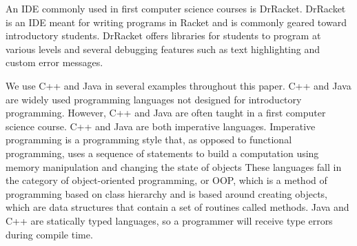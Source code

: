 \documentclass{sig-alternate}
\begin{document}
An IDE commonly used in first computer science courses is DrRacket.
DrRacket is an IDE meant for writing programs in Racket and is commonly geared toward introductory students.
DrRacket offers libraries for students to program at various levels and several debugging features such as text highlighting and custom error messages.

We use C++ and Java in several examples throughout this paper.
C++ and Java are widely used programming languages not designed for introductory programming.
However, C++ and Java are often taught in a first computer science course.
C++ and Java are both imperative languages.
Imperative programming is a programming style that, as opposed to functional programming, uses a sequence of statements to build a computation using memory manipulation and changing the state of objects
These languages fall in the category of object-oriented programming, or OOP, which is a method of programming based on class hierarchy and is based around creating objects, which are data structures that contain a set of routines called methods. 
Java and C++ are statically typed languages, so a programmer will receive type errors during compile time.



\end{document}
